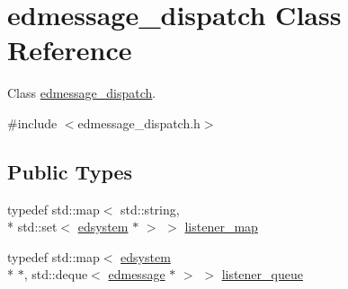 \hypertarget{classedmessage__dispatch}{\section{edmessage\-\_\-dispatch Class Reference}
\label{classedmessage__dispatch}
}


Class \hyperlink{classedmessage__dispatch}{edmessage\-\_\-dispatch}.  




{\ttfamily \#include $<$edmessage\-\_\-dispatch.\-h$>$}

\subsection*{Public Types}
\begin{DoxyCompactItemize}
\item 
typedef std\-::map$<$ std\-::string, \\*
std\-::set$<$ \hyperlink{classedsystem}{edsystem} $\ast$ $>$ $>$ \hyperlink{classedmessage__dispatch_a6fca76f17817a3296ed712c8a2cc52d1}{listener\-\_\-map}
\item 
typedef std\-::map$<$ \hyperlink{classedsystem}{edsystem} \\*
$\ast$, std\-::deque$<$ \hyperlink{structedmessage}{edmessage} $\ast$ $>$ $>$ \hyperlink{classedmessage__dispatch_a4e1b44916d32280f02e952e0e41774bc}{listener\-\_\-queue}
\end{DoxyCompactItemize}
